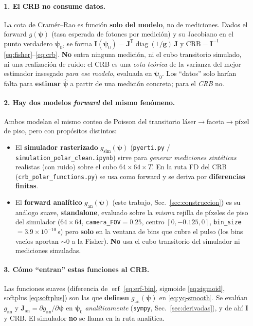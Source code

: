 \documentclass[11pt,a4paper]{article}
\theoremstyle{plain}
\theoremstyle{definition}
\newcommand{\vect}[1]{\boldsymbol{#1}}
\newcommand{\matr}[1]{\mathbf{#1}}
\newcommand{\erf}{\operatorname{erf}}
\DeclareMathOperator{\diag}{diag}
\begin{document}
\paragraph{1. El CRB no consume datos.} La cota de Cram\'er--Rao es funci\'on
\textbf{solo del modelo}, no de mediciones. Dados el forward $g(\vect{\psi})$
(tasa esperada de fotones por medici\'on) y su Jacobiano en el punto verdadero
$\vect{\psi}_0$, se forma $\matr{I}(\vect{\psi}_0)=\matr J^{\mathsf
T}\diag(1/\vect g)\,\matr J$ y $\mathrm{CRB}=\matr I^{-1}$
\eqref{eq:fisher}--\eqref{eq:crb}. \textbf{No} entra ninguna medici\'on, ni el
cubo transitorio simulado, ni una realizaci\'on de ruido: el CRB es una
\emph{cota te\'orica} de la varianza del mejor estimador insesgado \emph{para ese
modelo}, evaluada en $\vect{\psi}_0$. Los ``datos'' solo har\'ian falta para
\textbf{estimar} $\hat{\vect{\psi}}$ a partir de una medici\'on concreta; para el
\emph{CRB} no.

\paragraph{2. Hay dos modelos \emph{forward} del mismo fen\'omeno.} Ambos modelan
el mismo conteo de Poisson del transitorio l\'aser$\to$faceta$\to$p\'ixel de piso,
pero con prop\'ositos distintos:
\begin{itemize}[nosep]
    \item El \textbf{simulador rasterizado} $g_{\mathrm{sim}}(\vect{\psi})$
    (\texttt{pyerti.py} / \texttt{simulation\_polar\_clean.ipynb}) sirve para
    \emph{generar mediciones sint\'eticas} realistas (con ruido) sobre el cubo
    $64\times64\times T$. En la ruta FD del CRB (\texttt{crb\_polar\_functions.py})
    se usa como forward y se deriva por \textbf{diferencias finitas}.
    \item El \textbf{forward anal\'itico} $g_{\mathrm{an}}(\vect{\psi})$
    (este trabajo, Sec.~\ref{sec:construccion}) es su an\'alogo suave,
    \textbf{standalone}, evaluado sobre la \emph{misma} rejilla de p\'ixeles de
    piso del simulador ($64\times64$, \texttt{camera\_FOV}$=0.25$, centro
    $[0,-0.125,0]$, \texttt{bin\_size}$=3.9\times10^{-10}$\,s) pero \textbf{solo}
    en la ventana de bins que cubre el pulso (los bins vac\'ios aportan $\sim0$ a
    la Fisher). \textbf{No} usa el cubo transitorio del simulador ni mediciones
    simuladas.
\end{itemize}

\paragraph{3. C\'omo ``entran'' estas funciones al CRB.} Las funciones suaves
(diferencia de $\erf$ \eqref{eq:erf-bin}, sigmoide \eqref{eq:sigmoid}, softplus
\eqref{eq:softplus}) son las que \textbf{definen} $g_{\mathrm{an}}(\vect{\psi})$
en \eqref{eq:yq-smooth}. Se eval\'uan $g_{\mathrm{an}}$ y
$\matr J_{\mathrm{an}}=\partial g_{\mathrm{an}}/\partial\vect{\psi}$ en
$\vect{\psi}_0$ \emph{anal\'iticamente} (\texttt{sympy}, Sec.~\ref{sec:derivadas}),
y de ah\'i $\matr I$ y $\mathrm{CRB}$. El simulador \textbf{no} se llama en la ruta
anal\'itica.
\end{document}
